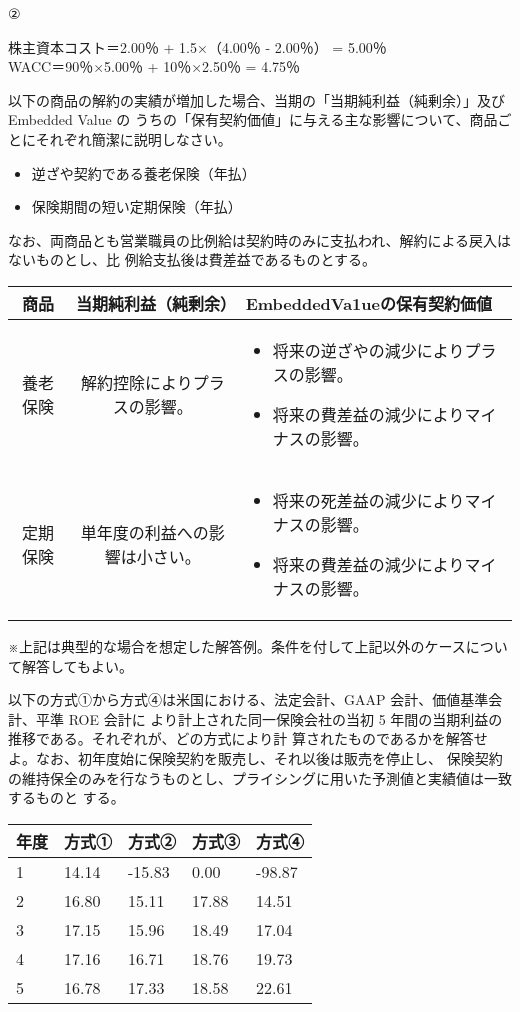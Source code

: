 \documentclass[report,gutter=10mm,fore-edge=10mm,uplatex,dvipdfmx]{jlreq}
\begin{document}
②

株主資本コスト＝2.00％ + 1.5×（4.00％ - 2.00％） = 5.00％\\
WACC＝90％×5.00％ + 10％×2.50％ = 4.75％

以下の商品の解約の実績が増加した場合、当期の「当期純利益（純剰余）」及び Embedded Value の
うちの「保有契約価値」に与える主な影響について、商品ごとにそれぞれ簡潔に説明しなさい。
\begin{itemize}
\item[] 逆ざや契約である養老保険（年払）
\item[] 保険期間の短い定期保険（年払）
\end{itemize}
なお、両商品とも営業職員の比例給は契約時のみに支払われ、解約による戻入はないものとし、比
例給支払後は費差益であるものとする。
\answer{}

 \begin{tabular}{|c|c|p{}|}
 \hline{}
商品&当期純利益（純剰余）& EmbeddedVa1ueの保有契約価値\\  \hline{}
養老保険&解約控除によりプラスの影響。&
\begin{itemize}
\item[] 将来の逆ざやの減少によりプラスの影響。
\item[] 将来の費差益の減少によりマイナスの影響。
\end{itemize}\\ \hline{}
定期保険& 
単年度の利益への影響は小さい。& 
\begin{itemize}
\item[]  将来の死差益の減少によりマイナスの影響。
\item[]  将来の費差益の減少によりマイナスの影響。
\end{itemize} \\
\hline
\end{tabular}

※上記は典型的な場合を想定した解答例。条件を付して上記以外のケースについて解答してもよい。

以下の方式①から方式④は米国における、法定会計、GAAP 会計、価値基準会計、平準 ROE 会計に
より計上された同一保険会社の当初 5 年間の当期利益の推移である。それぞれが、どの方式により計
算されたものであるかを解答せよ。なお、初年度始に保険契約を販売し、それ以後は販売を停止し、
保険契約の維持保全のみを行なうものとし、プライシングに用いた予測値と実績値は一致するものと
する。

\begin{tabular}{lllll}
年度&方式①&方式②&方式③&方式④\\ \hline
1&14.14&-15.83&0.00&-98.87\\
2&16.80&15.11&17.88&14.51\\
3&17.15&15.96&18.49&17.04\\
4&17.16&16.71&18.76&19.73\\
5&16.78&17.33&18.58&22.61\\
\end{tabular}
\answer{}
\end{document}
